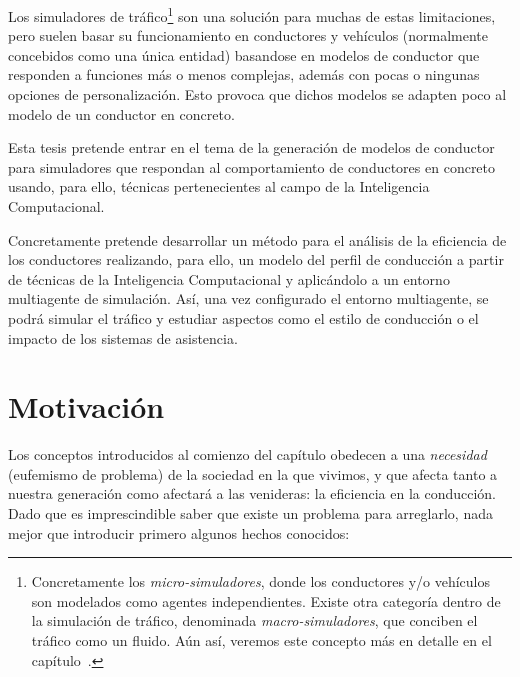 Los simuladores de tráfico\footnote{Concretamente los \textit{micro-simuladores}, donde los conductores y/o vehículos son modelados como agentes independientes. Existe otra categoría dentro de la simulación de tráfico, denominada \textit{macro-simuladores}, que conciben el tráfico como un fluido. Aún así, veremos este concepto más en detalle en el capítulo~.} son una solución para muchas de estas limitaciones, pero suelen basar su funcionamiento en conductores y vehículos (normalmente concebidos como una única entidad) basandose en modelos de conductor que responden a funciones más o menos complejas, además con pocas o ningunas opciones de personalización. Esto provoca que dichos modelos se adapten poco al modelo de un conductor en concreto.

Esta tesis pretende entrar en el tema de la generación de modelos de conductor para simuladores que respondan al comportamiento de conductores en concreto usando, para ello, técnicas pertenecientes al campo de la Inteligencia Computacional.

Concretamente pretende desarrollar un método para el análisis de la eficiencia de los conductores realizando, para ello, un modelo del perfil de conducción a partir de técnicas de la Inteligencia Computacional y aplicándolo a un entorno multiagente de simulación. Así, una vez configurado el entorno multiagente, se podrá simular el tráfico y estudiar aspectos como el estilo de conducción o el impacto de los sistemas de asistencia.


\section{Motivación}

Los conceptos introducidos al comienzo del capítulo obedecen a una \textit{necesidad} (eufemismo de problema) de la sociedad en la que vivimos, y que afecta tanto a nuestra generación como afectará a las venideras: la eficiencia en la conducción. Dado que es imprescindible saber que existe un problema para arreglarlo, nada mejor que introducir primero algunos hechos conocidos:

